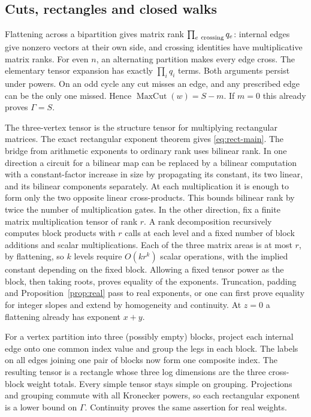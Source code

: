 \documentclass[11pt,a4paper]{article}
\theoremstyle{definition}
\newcommand{\mc}{\operatorname{MaxCut}}
\begin{document}
\subsection{Cuts, rectangles and closed walks}

Flattening across a bipartition gives matrix rank \(\prod_{e\ {\rm crossing}}q_e\): internal edges give nonzero vectors at their own side, and crossing identities have multiplicative matrix ranks. For even \(n\), an alternating partition makes every edge cross. The elementary tensor expansion has exactly \(\prod_iq_i\) terms. Both arguments persist under powers. On an odd cycle any cut misses an edge, and any prescribed edge can be the only one missed. Hence \(\mc(w)=S-m\). If \(m=0\) this already proves \(\Gamma=S\).

The three-vertex tensor is the structure tensor for multiplying rectangular matrices. The exact rectangular exponent theorem \cite{Rect} gives \eqref{eq:rect-main}. The bridge from arithmetic exponents to ordinary rank uses bilinear rank. In one direction a circuit for a bilinear map can be replaced by a bilinear computation with a constant-factor increase in size by propagating its constant, its two linear, and its bilinear components separately. At each multiplication it is enough to form only the two opposite linear cross-products. This bounds bilinear rank by twice the number of multiplication gates. In the other direction, fix a finite matrix multiplication tensor of rank \(r\). A rank decomposition recursively computes block products with \(r\) calls at each level and a fixed number of block additions and scalar multiplications. Each of the three matrix areas is at most \(r\), by flattening, so \(k\) levels require \(O(k r^k)\) scalar operations, with the implied constant depending on the fixed block. Allowing a fixed tensor power as the block, then taking roots, proves equality of the exponents. Truncation, padding and Proposition~\ref{prop:real} pass to real exponents, or one can first prove equality for integer slopes and extend by homogeneity and continuity. At \(z=0\) a flattening already has exponent \(x+y\).

For a vertex partition into three (possibly empty) blocks, project each internal edge onto one common index value and group the legs in each block. The labels on all edges joining one pair of blocks now form one composite index. The resulting tensor is a rectangle whose three log dimensions are the three cross-block weight totals. Every simple tensor stays simple on grouping. Projections and grouping commute with all Kronecker powers, so each rectangular exponent is a lower bound on \(\Gamma\). Continuity proves the same assertion for real weights.
\end{document}
